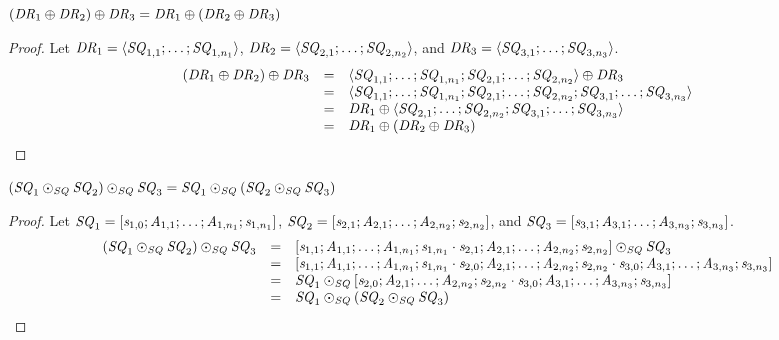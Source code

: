 \documentclass[numbers,10pt,preprint\ifanon ,nocopyrightspace\fi]{sigplanconf}
\begin{document}
\begin{lemma}
  \label{lem:dnf-or-assoc}
  $(\mathit{DR}_1 \oplus \mathit{DR}_2) \oplus \mathit{DR}_3 =
  \mathit{DR}_1 \oplus (\mathit{DR}_2 \oplus \mathit{DR}_3)$
\end{lemma}
\begin{proof}
  Let $\mathit{DR}_1 = \langle\mathit{SQ}_{1,1};\ldots;\mathit{SQ}_{1,n_1}\rangle$,
  $\mathit{DR}_2 = \langle\mathit{SQ}_{2,1};\ldots;\mathit{SQ}_{2,n_2}\rangle$, and
  $\mathit{DR}_3 = \langle\mathit{SQ}_{3,1};\ldots;\mathit{SQ}_{3,n_3}\rangle$.
  \[
    \begin{array}{rcl}
      (\mathit{DR}_1 \oplus \mathit{DR}_2) \oplus \mathit{DR}_3
      & = & \langle\mathit{SQ}_{1,1};\ldots;\mathit{SQ}_{1,n_1};
            \mathit{SQ}_{2,1};\ldots;\mathit{SQ}_{2,n_2}\rangle \oplus \mathit{DR}_3\\
      & = & \langle\mathit{SQ}_{1,1};\ldots;\mathit{SQ}_{1,n_1};
            \mathit{SQ}_{2,1};\ldots;\mathit{SQ}_{2,n_2};
            \mathit{SQ}_{3,1};\ldots;\mathit{SQ}_{3,n_3}\rangle\\
      & = & \mathit{DR}_1 \oplus
            \langle\mathit{SQ}_{2,1};\ldots;\mathit{SQ}_{2,n_2};
            \mathit{SQ}_{3,1};\ldots;\mathit{SQ}_{3,n_3}\rangle\\
      & = & \mathit{DR}_1 \oplus (\mathit{DR}_2 \oplus \mathit{DR}_3)
    \end{array}
  \]
\end{proof}

\begin{lemma}
  \label{lem:sequence-concat-assoc}
  $(\mathit{SQ}_1 \odot_{\mathit{SQ}} \mathit{SQ}_2) \odot_{\mathit{SQ}} \mathit{SQ}_3 =
  \mathit{SQ}_1 \odot_{\mathit{SQ}} (\mathit{SQ}_2 \odot_{\mathit{SQ}} \mathit{SQ}_3)$
\end{lemma}
\begin{proof}
  Let $\mathit{SQ}_1 =
  [\mathit{s}_{1,0};\mathit{A}_{1,1};\ldots;\mathit{A}_{1,n_1};\mathit{s}_{1,n_1}]$,
  $\mathit{SQ}_2 =
  [\mathit{s}_{2,1};\mathit{A}_{2,1};\ldots;\mathit{A}_{2,n_2};\mathit{s}_{2,n_2}]$,
  and $\mathit{SQ}_3 =
  [\mathit{s}_{3,1};\mathit{A}_{3,1};\ldots;\mathit{A}_{3,n_3};\mathit{s}_{3,n_3}]$.
  \[
    \begin{array}{rcl}
      (\mathit{SQ}_1 \odot_{\mathit{SQ}} \mathit{SQ}_2) \odot_{\mathit{SQ}} \mathit{SQ}_3
      & = & [\mathit{s}_{1,1};\mathit{A}_{1,1};\ldots;\mathit{A}_{1,n_1};
            \mathit{s}_{1,n_1}\cdot\mathit{s}_{2,1};
            \mathit{A}_{2,1};\ldots;\mathit{A}_{2,n_2};\mathit{s}_{2,n_2}]
            \odot_{\mathit{SQ}} \mathit{SQ}_3\\
      & = & [\mathit{s}_{1,1};\mathit{A}_{1,1};\ldots;\mathit{A}_{1,n_1};
            \mathit{s}_{1,n_1}\cdot\mathit{s}_{2,0};
            \mathit{A}_{2,1};\ldots;\mathit{A}_{2,n_2};
            \mathit{s}_{2,n_2}\cdot\mathit{s}_{3,0};
            \mathit{A}_{3,1};\ldots;\mathit{A}_{3,n_3};\mathit{s}_{3,n_3}]\\
      & = & \mathit{SQ}_1 \odot_{\mathit{SQ}}
            [\mathit{s}_{2,0};
            \mathit{A}_{2,1};\ldots;\mathit{A}_{2,n_2};
            \mathit{s}_{2,n_2}\cdot\mathit{s}_{3,0};
            \mathit{A}_{3,1};\ldots;\mathit{A}_{3,n_3};\mathit{s}_{3,n_3}]\\
      & = & \mathit{SQ}_1 \odot_{\mathit{SQ}} (\mathit{SQ}_2 \odot_{\mathit{SQ}} \mathit{SQ}_3)
    \end{array}
  \]
\end{proof}
\end{document}
